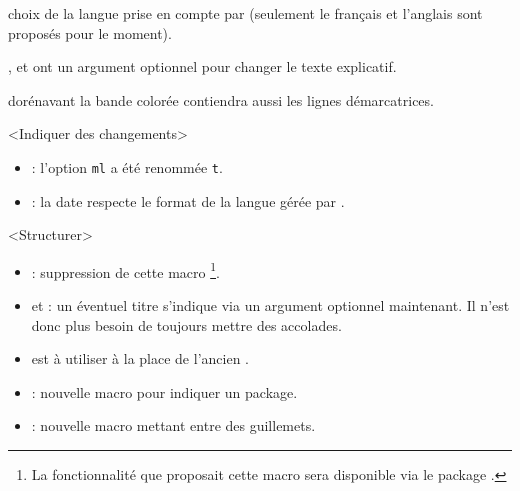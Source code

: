

\begin{bdoctopic}
    choix de la langue prise en compte par 
    (seulement le français et l'anglais sont proposés pour le moment).
\end{bdoctopic}




\begin{bdoctopic}
    ,
    et
    ont un argument optionnel pour changer le texte explicatif.
\end{bdoctopic}




\begin{bdoctopic}
    dorénavant la bande colorée contiendra aussi les lignes démarcatrices.
\end{bdoctopic}




\begin{bdoctopic}<Indiquer des changements>
    \begin{itemize}
        \item {} :
              l'option \texttt{ml} a été renommée \texttt{t}.

        \item {} :
              la date respecte le format de la langue gérée par .
    \end{itemize}
\end{bdoctopic}




\begin{bdoctopic}<Structurer>
    \begin{itemize}
        \item {} :
              suppression de cette macro
              \footnote{
                  La fonctionnalité que proposait cette macro sera disponible via le package .
              }.

        \item {} et  :
              un éventuel titre s'indique via un argument optionnel maintenant.
              Il n'est donc plus besoin de toujours mettre des accolades.

        \item {}
              est à utiliser à la place de l'ancien
              .

        \item {} :
              nouvelle macro pour indiquer un package.

        \item {} :
              nouvelle macro mettant entre des guillemets.
    \end{itemize}
\end{bdoctopic}

